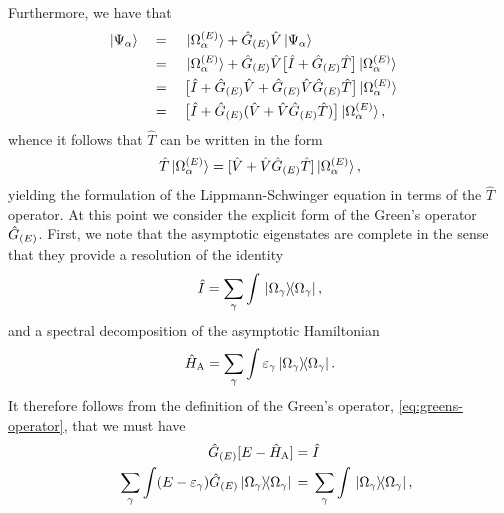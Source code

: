 \documentclass[]{article}
\begin{document}
Furthermore, we have that
\begin{alignat*}{4}
  &
  \ket{\Psi_{\alpha}}
  &&
  {}={}
  &&
  \ket*{\Omega_{\alpha}^{\lr{E}}}
  +
  \hat{G}_{\lr{E}}
  \hat{V}
  \ket{\Psi_{\alpha}}
  &
  \\
  &
  &&
  {}={}
  &&
  \ket*{\Omega_{\alpha}^{\lr{E}}}
  +
  \hat{G}_{\lr{E}}
  \hat{V}
  \lrsq[\big]
  {
    \hat{I}
    +
    \hat{G}_{\lr{E}}
    \hat{T}
  }
  \ket*{\Omega_{\alpha}^{\lr{E}}}
  &
  \\
  &
  &&
  {}={}
  &&
  \lrsq[\big]
  {
    \hat{I}
    +
    \hat{G}_{\lr{E}}
    \hat{V}
    +
    \hat{G}_{\lr{E}}
    \hat{V}
    \hat{G}_{\lr{E}}
    \hat{T}
  }
  \ket*{\Omega_{\alpha}^{\lr{E}}}
  &
  \\
  &
  &&
  {}={}
  &&
  \lrsq[\big]
  {
    \hat{I}
    +
    \hat{G}_{\lr{E}}
    \lr
    {
      \hat{V}
      +
      \hat{V}
      \hat{G}_{\lr{E}}
      \hat{T}
    }
  }
  \ket*{\Omega_{\alpha}^{\lr{E}}}
  ,
  &
\end{alignat*}
whence it follows that $\hat{T}$ can be written in the form
\begin{equation}
  \label{eq:ls-t-greens}
  \hat{T}
  \ket*{\Omega_{\alpha}^{\lr{E}}}
  =
  \lrsq
  {
    \hat{V}
    +
    \hat{V}
    \hat{G}_{\lr{E}}
    \hat{T}
  }
  \ket*{\Omega_{\alpha}^{\lr{E}}}
  ,
\end{equation}
yielding the formulation of the Lippmann-Schwinger equation in terms of the
$\hat{T}$ operator.
At this point we consider the explicit form of the Green's operator
$\hat{G}_{\lr{E}}$.
First, we note that the asymptotic eigenstates are complete in the sense that
they provide a resolution of the identity
\begin{equation}
  \label{eq:asymptotic-complete}
  \hat{I}
  =
  \sum_{\gamma}\int
  \ketbra*{\Omega_{\gamma}}{\Omega_{\gamma}}
  ,
\end{equation}
and a spectral decomposition of the asymptotic Hamiltonian
\begin{equation*}
  \hat{H}_{\rm{A}}
  =
  \sum_{\gamma}\int
  \varepsilon_{\gamma}
  \ketbra*{\Omega_{\gamma}}{\Omega_{\gamma}}
  .
\end{equation*}
It therefore follows from the definition of the Green's operator,
\eqref{eq:greens-operator}, that we must have
\begin{alignat*}{2}
  &
  &
  \hat{G}_{\lr{E}}
  \lrsq
  {
    E
    -
    \hat{H}_{\rm{A}}
  }
  {}={}
  &
  \hat{I}
  \\
  &
  &
  \sum_{\gamma}\int
  \lr
  {
    E
    -
    \varepsilon_{\gamma}
  }
  \hat{G}_{\lr{E}}
  \ketbra*{\Omega_{\gamma}}{\Omega_{\gamma}}
  {}={}
  &
  \sum_{\gamma}\int
  \ketbra*{\Omega_{\gamma}}{\Omega_{\gamma}}
  ,
\end{alignat*}
\end{document}
